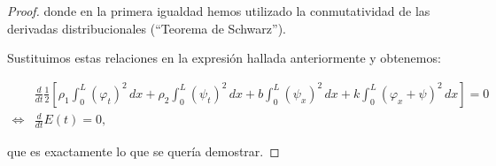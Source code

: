 \begin{proof}
    donde en la primera igualdad hemos utilizado la conmutatividad de las derivadas distribucionales (``Teorema de Schwarz'').

    Sustituimos estas relaciones en la expresión hallada anteriormente y obtenemos:

    \begin{align*}
        &\frac{d}{dt}\frac{1}{2}\left [\rho_1 \int_0^L(\varphi_t)^2 \, dx + \rho_2 \int_0^L (\psi_t)^2 \, dx + b\int_0^L (\psi_x)^2 \, dx + k \int_0^L (\varphi_x + \psi)^2 \, dx \right] = 0\\
        \iff&\frac{d}{dt}E(t) = 0,
    \end{align*}

    que es exactamente lo que se quería demostrar.
\end{proof}